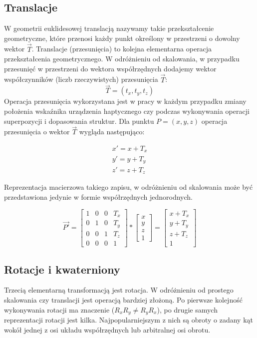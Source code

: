 \documentclass[licencjacka]{pracamgr}
\begin{document}
\subsection{Translacje}
W geometrii euklidesowej translacją nazywamy takie przekształcenie geometryczne, które przenosi każdy punkt określony w przestrzeni o dowolny wektor $\vec{T}$. Translacje (przesunięcia) to kolejna elementarna operacja przekształcenia geometrycznego. W odróżnieniu od skalowania, w przypadku przesunięć w przestrzeni do wektora współrzędnych dodajemy wektor współczynników (liczb rzeczywistych) przesunięcia $\vec{T}$:
$$
\vec{T}=(t_x, t_y, t_z)
$$
Operacja przesunięcia wykorzystana jest w pracy w każdym przypadku zmiany położenia wskaźnika urządzenia haptycznego czy podczas wykonywania operacji superpozycji i dopasowania struktur. Dla punktu $P=(x,y,z)$ operacja przesunięcia o wektor $\vec{T}$ wygląda następująco:

$$
\begin{array}{lr}
x'=x+T_x \\
y'=y+T_y \\
z'=z+T_z
\end{array}
$$

Reprezentacja macierzowa takiego zapisu, w odróżnieniu od skalowania może być przedstawiona jedynie w formie współrzędnych jednorodnych. 

$$
\vec{P'}=
\begin{bmatrix}
1 & 0 & 0 & T_x \\
0 & 1 & 0 & T_y \\
0 & 0 & 1 & T_z \\
0 & 0 & 0 & 1
\end{bmatrix}
*
\begin{bmatrix}
x \\
y \\
z \\
1
\end{bmatrix}
=
\begin{bmatrix}
x+T_x \\
y+T_y \\
z+T_z \\
1
\end{bmatrix}
$$
\subsection{Rotacje i kwaterniony}
Trzecią elementarną transformacją jest rotacja. W odróżnieniu od prostego skalowania czy translacji jest operacją bardziej złożoną. Po pierwsze kolejność wykonywania rotacji ma znaczenie ($R_xR_y\neq R_yR_x$), po drugie samych reprezentacji rotacji jest kilka. Najpopularniejszym z nich są obroty o zadany kąt wokół jednej z osi układu współrzędnych lub arbitralnej osi obrotu.
\end{document}
